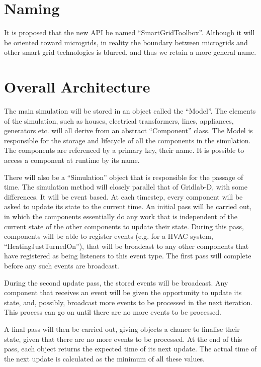 \documentclass[12pt]{article}
\begin{document}
\section{Naming}
It is proposed that the new API be named ``SmartGridToolbox''. Although it will be oriented toward microgrids, in reality the boundary between microgrids and other smart grid technologies is blurred, and thus we retain a more general name.

\section{Overall Architecture}
The main simulation will be stored in an object called the ``Model''. The elements of the simulation, such as houses, electrical transformers, lines, appliances, generators etc. will all derive from an abstract ``Component'' class. The Model is responsible for the storage and lifecycle of all the components in the simulation. The components are referenced by a primary key, their name. It is possible to access a component at runtime by its name.

There will also be a ``Simulation'' object that is responsible for the passage of time. The simulation method will closely parallel that of Gridlab-D, with some differences. It will be event based. At each timestep, every component will be asked to update its state to the current time. An initial pass will be carried out, in which the components essentially do any work that is independent of the current state of the other components to update their state. During this pass, components will be able to register events (e.g. for a HVAC system, ``HeatingJustTurnedOn''), that will be broadcast to any other components that have registered as being listeners to this event type. The first pass will complete before any such events are broadcast.

During the second update pass, the stored events will be broadcast. Any component that receives an event will be given the opportunity to update its state, and, possibly, broadcast more events to be processed in the next iteration. This process can go on until there are no more events to be processed.

A final pass will then be carried out, giving objects a chance to finalise their state, given that there are no more events to be processed. At the end of this pass, each object returns the expected time of its next update. The actual time of the next update is calculated as the minimum of all these values.
\end{document}
